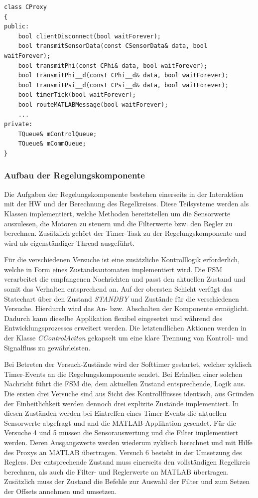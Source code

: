 \newpage
\begin{lstlisting}
class CProxy
{
public:
	bool clientDisconnect(bool waitForever);
	bool transmitSensorData(const CSensorData& data, bool waitForever);
	bool transmitPhi(const CPhi& data, bool waitForever);
	bool transmitPhi__d(const CPhi__d& data, bool waitForever);
	bool transmitPsi__d(const CPsi__d& data, bool waitForever);
	bool timerTick(bool waitForever);
	bool routeMATLABMessage(bool waitForever);
	...
private:
	TQueue& mControlQueue;
	TQueue& mCommQueue;
}
\end{lstlisting}

\subsubsection{Aufbau der Regelungskomponente}
Die Aufgaben der Regelungskomponente bestehen einerseits in der Interaktion mit der HW und der Berechnung des Regelkreises. Diese Teilsysteme werden als Klassen implementiert, welche Methoden bereitstellen um die Sensorwerte auszulesen, die Motoren zu steuern und die Filterwerte bzw. den Regler zu berechnen. Zusätzlich gehört der Timer-Task zu der Regelungskomponente und wird als eigenständiger Thread ausgeführt. 


Für die verschiedenen Versuche ist eine zusätzliche Kontrolllogik erforderlich, welche in Form eines Zustandsautomaten implementiert wird. Die FSM verarbeitet die empfangenen Nachrichten und passt den aktuellen Zustand und somit das Verhalten entsprechend an. Auf der obersten Schicht verfügt das Statechart über den Zustand \textit{STANDBY} und Zustände für die verschiedenen Versuche. Hierdurch wird das An- bzw. Abschalten der Komponente ermöglicht. Dadurch kann dieselbe Applikation flexibel eingesetzt und während des Entwicklungsprozesses erweitert werden. Die letztendlichen Aktionen werden in der Klasse \textit{CControlAciton} gekapselt um eine klare Trennung von Kontroll- und Signalfluss zu gewährleisten.


Bei Betreten der Versuch-Zustände wird der Softtimer gestartet, welcher zyklisch Timer-Events an die Regelungskomponente sendet. Bei Erhalten einer solchen Nachricht führt die FSM die, dem aktuellen Zustand entsprechende, Logik aus. 
Die ersten drei Versuche sind aus Sicht des Kontrollflusses identisch, aus Gründen der Einheitlichkeit werden dennoch drei explizite Zustände implementiert. In diesen Zuständen werden bei Eintreffen eines Timer-Events die aktuellen Sensorwerte abgefragt und and die MATLAB-Applikation gesendet. Für die Versuche 4 und 5 müssen die Sensorauswertung und die Filter implementiert werden. Deren Ausgangswerte werden wiederum zyklisch berechnet und mit Hilfe des Proxys an MATLAB übertragen. Versuch 6 besteht in der Umsetzung des Reglers. Der entsprechende Zustand muss einerseits den vollständigen Regelkreis berechnen, als auch die Filter- und Reglerwerte an MATLAB übertragen. Zusätzlich muss der Zustand die Befehle zur Auswahl der Filter und zum Setzen der Offsets annehmen und umsetzen.

